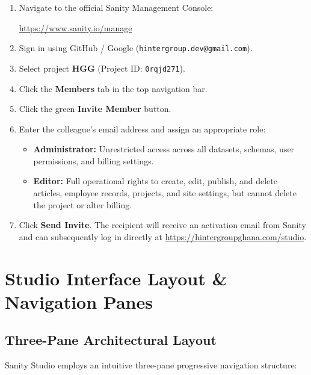 \documentclass[11pt,a4paper,oneside]{book}
\begin{document}
\begin{enumerate}[leftmargin=*,label=\textbf{Step \arabic*:}]
  \item Navigate to the official Sanity Management Console:
    \begin{center}
      \url{https://www.sanity.io/manage}
    \end{center}
  \item Sign in using GitHub / Google (\texttt{hintergroup.dev@gmail.com}).
  \item Select project \textbf{HGG} (Project ID: \texttt{0rqjd271}).
  \item Click the \textbf{Members} tab in the top navigation bar.
  \item Click the green \textbf{Invite Member} button.
  \item Enter the colleague's email address and assign an appropriate role:
    \begin{itemize}[leftmargin=1.2cm]
      \item \textbf{Administrator:} Unrestricted access across all datasets, schemas, user permissions, and billing settings.
      \item \textbf{Editor:} Full operational rights to create, edit, publish, and delete articles, employee records, projects, and site settings, but cannot delete the project or alter billing.
    \end{itemize}
  \item Click \textbf{Send Invite}. The recipient will receive an activation email from Sanity and can subsequently log in directly at \url{https://hintergroupghana.com/studio}.
\end{enumerate}

\chapter{Studio Interface Layout \& Navigation Panes}
\label{chap:interface}

\section{Three-Pane Architectural Layout}
Sanity Studio employs an intuitive three-pane progressive navigation structure:
\end{document}
